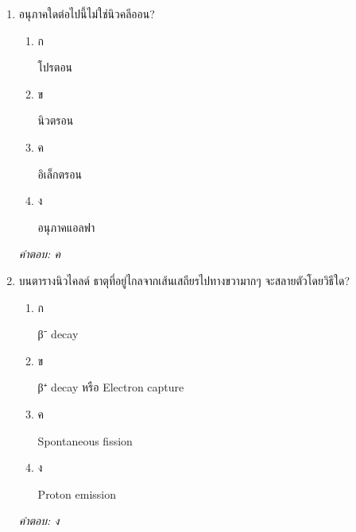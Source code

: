 \documentclass[12pt]{article}
\begin{document}
\begin{enumerate}[label=\arabic*., itemsep=0.5\baselineskip, topsep=0.5\baselineskip, leftmargin=*]
\item อนุภาคใดต่อไปนี้ไม่ใช่นิวคลีออน?
\begin{enumerate}[label=\alph*)., itemsep=0.3\baselineskip, topsep=0.3\baselineskip]
\item ก\ 
\begin{minipage}[t]{0.9\linewidth}
\raggedright โปรตอน
\end{minipage}
\item ข\ 
\begin{minipage}[t]{0.9\linewidth}
\raggedright นิวตรอน
\end{minipage}
\item ค\ 
\begin{minipage}[t]{0.9\linewidth}
\raggedright อิเล็กตรอน
\end{minipage}
\item ง\ 
\begin{minipage}[t]{0.9\linewidth}
\raggedright อนุภาคแอลฟา
\end{minipage}
\end{enumerate}
\vspace{-0.3\baselineskip}
\begin{small}
\textit{คำตอบ: ค}
\end{small}

\item บนตารางนิวไคลด์ ธาตุที่อยู่ไกลจากเส้นเสถียรไปทางขวามากๆ จะสลายตัวโดยวิธีใด?
\begin{enumerate}[label=\alph*)., itemsep=0.3\baselineskip, topsep=0.3\baselineskip]
\item ก\ 
\begin{minipage}[t]{0.9\linewidth}
\raggedright β⁻ decay
\end{minipage}
\item ข\ 
\begin{minipage}[t]{0.9\linewidth}
\raggedright β⁺ decay หรือ Electron capture
\end{minipage}
\item ค\ 
\begin{minipage}[t]{0.9\linewidth}
\raggedright Spontaneous fission
\end{minipage}
\item ง\ 
\begin{minipage}[t]{0.9\linewidth}
\raggedright Proton emission
\end{minipage}
\end{enumerate}
\vspace{-0.3\baselineskip}
\begin{small}
\textit{คำตอบ: ง}
\end{small}


\end{enumerate}
\end{document}
